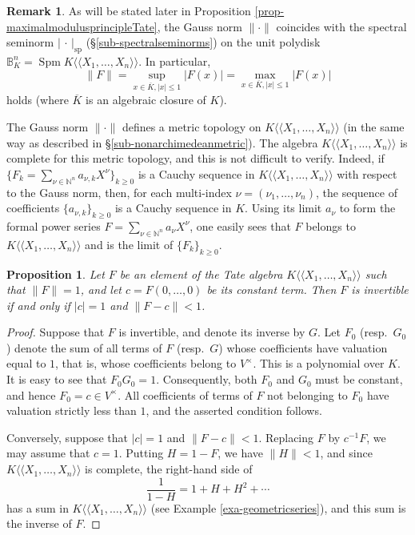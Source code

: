\documentclass[a4paper,12pt, dvipdfmx]{jsbook}
\def\N{\mathbb{N}}
\def\B{\mathbb{B}}
\def\ovl#1{\overline{#1}}%
\def\sp{\mathop{\mathrm{sp}}\nolimits}
\def\Spm{\mathop{\mathrm{Spm}}\nolimits}
\def\dl{\langle\!\langle}
\def\dr{\rangle\!\rangle}
\newcommand{\abs}[1]{\lvert#1\rvert}
\newcommand{\abss}[1]{\|#1\|}
\theoremstyle{plain}
\newtheorem{prop}[thm]{\bfseries Proposition}
\theoremstyle{definition}
\newtheorem{rem}[thm]{\bfseries Remark}
\begin{document}
\begin{rem}\label{rem-Gaussspectral}{\rm 
As will be stated later in Proposition \ref{prop-maximalmodulusprincipleTate}, the Gauss norm $\abss{\cdot}$ coincides with the spectral seminorm $\abs{\,\cdot\,}_{\sp}$ (\S\ref{sub-spectralseminorms}) on the unit polydisk $\B^n_K=\Spm K\dl X_1,\ldots,X_n\dr$. In particular,
$$
\abss{F}=\sup_{x\in\ovl{K},\abs{x}\leq 1}\abs{F(x)}=\max_{x\in\ovl{K},\abs{x}\leq 1}\abs{F(x)}
$$
holds (where $\ovl{K}$ is an algebraic closure of $K$).}
\end{rem}

The Gauss norm $\abss{\cdot}$ defines a metric topology on $K\dl X_1,\ldots,X_n\dr$ (in the same way as described in \S\ref{sub-nonarchimedeanmetric}).
The algebra $K\dl X_1,\ldots,X_n\dr$ is complete for this metric topology, and this is not difficult to verify.
Indeed, if $\{F_k=\sum_{\nu\in\N^n}a_{\nu,k}X^{\nu}\}_{k\geq 0}$ is a Cauchy sequence in $K\dl X_1,\ldots,X_n\dr$ with respect to the Gauss norm, then, for each multi-index $\nu=(\nu_1,\ldots,\nu_n)$, the sequence of coefficients $\{a_{\nu,k}\}_{k\geq 0}$ is a Cauchy sequence in $K$. Using its limit $a_{\nu}$ to form the formal power series $F=\sum_{\nu\in\N^n}a_{\nu}X^{\nu}$, one easily sees that $F$ belongs to $K\dl X_1,\ldots,X_n\dr$ and is the limit of $\{F_k\}_{k\geq 0}$.

\begin{prop}\label{prop-invertibleelementtatealgebra}{\rm 
Let $F$ be an element of the Tate algebra $K\dl X_1,\ldots,X_n\dr$ such that $\abss{F}=1$, and let $c=F(0,\ldots,0)$ be its constant term.
Then $F$ is invertible if and only if $\abs{c}=1$ and $\abss{F-c}<1$.}
\end{prop}

\begin{proof}[Proof]
Suppose that $F$ is invertible, and denote its inverse by $G$.
Let $F_0$ (resp.\ $G_0$) denote the sum of all terms of $F$ (resp.\ $G$) whose coefficients have valuation equal to $1$, that is, whose coefficients belong to $V^{\times}$. This is a polynomial over $K$.
It is easy to see that $F_0G_0=1$.
Consequently, both $F_0$ and $G_0$ must be constant, and hence $F_0=c\in V^{\times}$.
All coefficients of terms of $F$ not belonging to $F_0$ have valuation strictly less than $1$, and the asserted condition follows.

Conversely, suppose that $\abs{c}=1$ and $\abss{F-c}<1$.
Replacing $F$ by $c^{-1}F$, we may assume that $c=1$.
Putting $H=1-F$, we have $\abss{H}<1$, and since $K\dl X_1,\ldots,X_n\dr$ is complete, the right-hand side of
$$
\frac{1}{1-H}=1+H+H^2+\cdots
$$
has a sum in $K\dl X_1,\ldots,X_n\dr$ (see Example \ref{exa-geometricseries}), and this sum is the inverse of $F$.
\end{proof}
\end{document}
